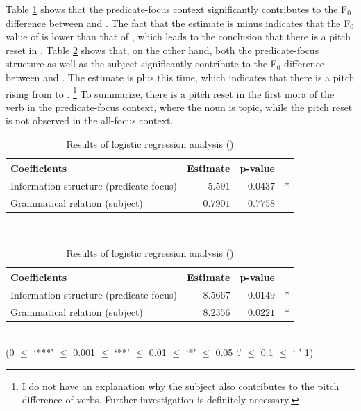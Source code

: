 Table \ref{Pitchv1n3GlmT} shows that
the predicate-focus context significantly contributes to
the F$_{0}$ difference between  and .
The fact that the estimate is minus indicates that the F$_{0}$ value of  is lower than that of ,
which leads to the conclusion that there is a pitch reset in .
Table \ref{Pitchv2v1GlmT} shows that, on the other hand,
both the predicate-focus structure as well as the subject significantly contribute to the F$_{0}$ difference between  and .
The estimate is plus this time,
which indicates that there is a pitch rising from  to .%
	\footnote{I do not have an explanation why the subject also contributes to the pitch difference of verbs.
	Further investigation is definitely necessary.}
To summarize,
there is a pitch reset in the first mora of the verb in the predicate-focus context, where the noun is topic,
while the pitch reset is not observed in the all-focus context.


\begin{table}
\centering
\caption{Results of logistic regression analysis ()}
\begin{tabular}{lrrr}
\toprule
Coefficients  & Estimate & p-value & \\
\midrule
 Information structure (predicate-focus)          & $-5.591$   & $0.0437$  & *  \\
 Grammatical relation (subject)          & $0.7901$   & $0.7758$  &   \\
\bottomrule
\end{tabular} \\
\label{Pitchv1n3GlmT}
\end{table}

\begin{table}
\centering
\caption{Results of logistic regression analysis ()}
\begin{tabular}{lrrr}
\toprule
Coefficients  & Estimate & p-value & \\
\midrule
 Information structure (predicate-focus)    & $8.5667$   & $0.0149$  & *  \\
 Grammatical relation (subject)     & $8.2356$   & $0.0221$  & *  \\
\bottomrule
\end{tabular} \\
\hfill{(0 $\le$ `***' $\le$ 0.001 $\le$ `**' $\le$ 0.01 $\le$ `*' $\le$ 0.05 `.' $\le$ 0.1 $\le$ ` ' 1)}
\label{Pitchv2v1GlmT}
\end{table}


